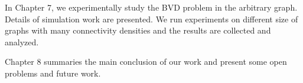  In Chapter 7, we experimentally study the BVD problem in the arbitrary graph. Details of simulation work are presented. We run experiments on different size of graphs with many connectivity densities and the results are collected and analyzed.
 

Chapter 8 summaries the main conclusion of our work and present some open problems and future work.
  

